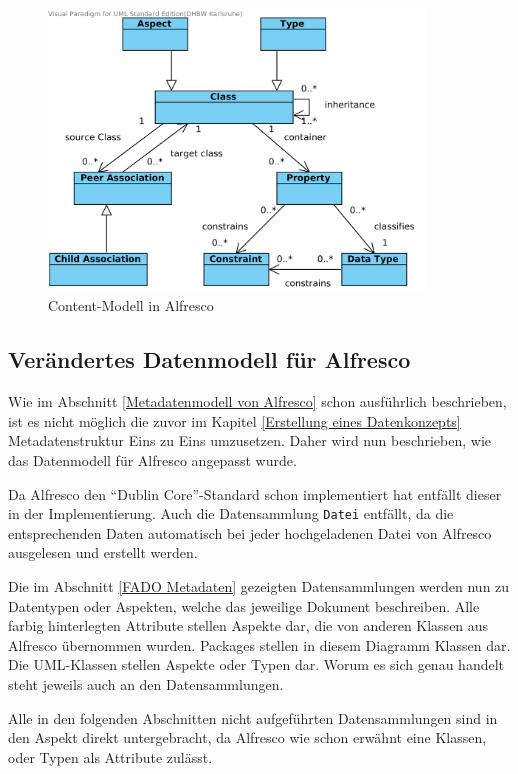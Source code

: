 \begin{figure}[!ht]
\centering
\includegraphics[width=10cm]{Bilder/Alfresco_Contentmodel.png}
\caption{Content-Modell in Alfresco}
\label{Alfresco Content-Modell}
\centering
\end{figure}

\subsection{Ver\"andertes Datenmodell f\"ur Alfresco}\label{Ver\"andertes Datenmodell f\"ur Alfresco}
Wie im Abschnitt \ref{Metadatenmodell von Alfresco} schon ausf\"uhrlich beschrieben, ist es nicht m\"oglich die zuvor im Kapitel \ref{Erstellung eines Datenkonzepts} Metadatenstruktur Eins zu Eins umzusetzen. Daher wird nun beschrieben, wie das Datenmodell f\"ur Alfresco angepasst wurde.

Da Alfresco den "`Dublin Core"'-Standard schon implementiert hat entf\"allt dieser in der Implementierung. Auch die Datensammlung \texttt{Datei} entf\"allt, da die entsprechenden Daten automatisch bei jeder hochgeladenen Datei von Alfresco ausgelesen und erstellt werden. 

Die im Abschnitt \ref{FADO Metadaten} gezeigten Datensammlungen werden nun zu Datentypen oder Aspekten, welche das jeweilige Dokument beschreiben. Alle farbig hinterlegten Attribute stellen Aspekte dar, die von anderen Klassen aus Alfresco \"ubernommen wurden.
Packages stellen in diesem Diagramm Klassen dar. Die UML-Klassen stellen Aspekte oder Typen dar. Worum es sich genau handelt steht jeweils auch an den Datensammlungen. 

Alle in den folgenden Abschnitten nicht aufgef\"uhrten Datensammlungen sind in den Aspekt direkt untergebracht, da Alfresco wie schon erw\"ahnt eine Klassen, oder Typen als Attribute zul\"asst.

